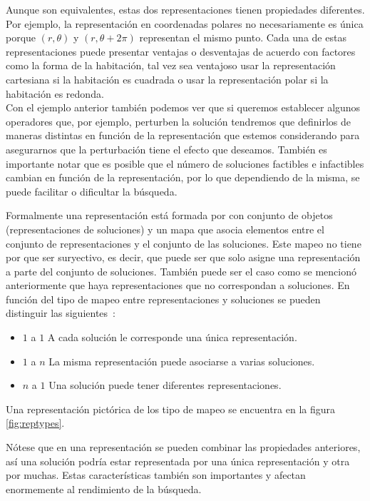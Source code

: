 Aunque son equivalentes, estas dos representaciones tienen propiedades diferentes. Por ejemplo, la representación en coordenadas polares no necesariamente es única porque $(r,\theta)$ y  $(r,\theta+2\pi)$ representan el mismo punto. Cada una de estas representaciones puede presentar ventajas o desventajas de acuerdo con factores como la forma de la habitación, tal vez sea ventajoso usar la representación cartesiana si la habitación es cuadrada o usar la representación polar si la habitación es redonda.\\

Con el ejemplo anterior también podemos ver que si queremos establecer algunos operadores que, por ejemplo, perturben la solución tendremos que definirlos de maneras 
distintas en función de la representación que estemos considerando para asegurarnos que la perturbación tiene el efecto que deseamos.
%
También es importante notar que es posible que el número de soluciones factibles e infactibles cambian en función de la representación, por lo que dependiendo de
la misma, se puede facilitar o dificultar la búsqueda.

Formalmente una representación está formada por con conjunto de objetos (representaciones de soluciones) y un mapa que asocia elementos entre el conjunto de representaciones
y el conjunto de las soluciones. 
%
Este mapeo no tiene por que ser suryectivo, es decir, que puede ser que solo asigne una representación a parte del conjunto de soluciones. 
%
También puede ser el caso como se mencionó anteriormente que haya representaciones que no correspondan a soluciones. 
%
En función del tipo de mapeo entre representaciones y soluciones se pueden distinguir las siguientes~\cite{Cheng1996}: 
\begin{itemize}
    \item $1$ a $1$ A cada solución le corresponde una única representación.
    \item $1$ a $n$ La misma representación puede asociarse a varias soluciones.
    \item $n$ a $1$ Una solución puede tener diferentes representaciones.
\end{itemize}
Una representación pictórica de los tipo de mapeo se encuentra en la figura \ref{fig:reptypes}.

Nótese que en una representación se pueden combinar las propiedades anteriores, así una solución podría estar representada por una única representación
y otra por muchas.
%
Estas características también son importantes y afectan enormemente al rendimiento de la búsqueda.

